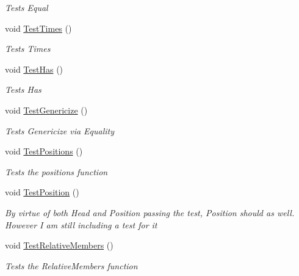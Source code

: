 \begin{DoxyCompactItemize}
\begin{DoxyCompactList}\small\item\em Tests Equal \end{DoxyCompactList}\item 
void \hyperlink{classHumDrumTests_1_1Collections_1_1Information_a3abf8aa3d994681399c94ca9d81381a6}{Test\+Times} ()
\begin{DoxyCompactList}\small\item\em Tests Times \end{DoxyCompactList}\item 
void \hyperlink{classHumDrumTests_1_1Collections_1_1Information_ad95bc6ede3653b323af915feb44ae1c9}{Test\+Has} ()
\begin{DoxyCompactList}\small\item\em Tests Has \end{DoxyCompactList}\item 
void \hyperlink{classHumDrumTests_1_1Collections_1_1Information_a82b372e763703189a6d970cb309c84b0}{Test\+Genericize} ()
\begin{DoxyCompactList}\small\item\em Tests Genericize via Equality \end{DoxyCompactList}\item 
void \hyperlink{classHumDrumTests_1_1Collections_1_1Information_af327f18ce9db1420f1603dadb1e2acbb}{Test\+Positions} ()
\begin{DoxyCompactList}\small\item\em Tests the positions function \end{DoxyCompactList}\item 
void \hyperlink{classHumDrumTests_1_1Collections_1_1Information_a0abbc714e07956429ff1731c72863790}{Test\+Position} ()
\begin{DoxyCompactList}\small\item\em By virtue of both Head and Position passing the test, Position should as well. However I am still including a test for it \end{DoxyCompactList}\item 
void \hyperlink{classHumDrumTests_1_1Collections_1_1Information_aa2f164c84590c2086232fd51ca77b3b2}{Test\+Relative\+Members} ()
\begin{DoxyCompactList}\small\item\em Tests the Relative\+Members function \end{DoxyCompactList}\end{DoxyCompactItemize}


